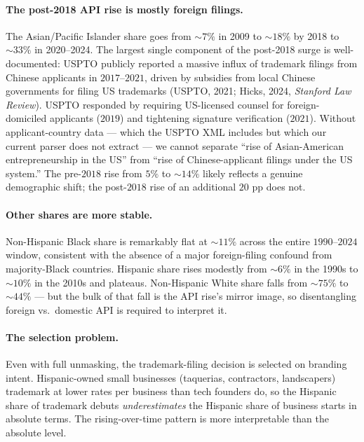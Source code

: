 \documentclass[11pt]{article}
\begin{document}
\paragraph{The post-2018 API rise is mostly foreign filings.} The
Asian/Pacific Islander share goes from $\sim 7\%$ in 2009 to $\sim 18\%$
by 2018 to $\sim 33\%$ in 2020--2024. The largest single component of
the post-2018 surge is well-documented: USPTO publicly reported a
massive influx of trademark filings from Chinese applicants in
$2017$--$2021$, driven by subsidies from local Chinese governments
for filing US trademarks (USPTO, 2021; Hicks, 2024, \emph{Stanford
Law Review}). USPTO responded by requiring US-licensed counsel for
foreign-domiciled applicants ($2019$) and tightening signature
verification ($2021$). Without applicant-country data --- which the
USPTO XML includes but which our current parser does not extract ---
we cannot separate ``rise of Asian-American entrepreneurship in the
US'' from ``rise of Chinese-applicant filings under the US system.''
The pre-$2018$ rise from $5\%$ to $\sim 14\%$ likely reflects a
genuine demographic shift; the post-$2018$ rise of an additional
$20$ pp does not.

\paragraph{Other shares are more stable.} Non-Hispanic Black share
is remarkably flat at $\sim 11\%$ across the entire $1990$--$2024$
window, consistent with the absence of a major foreign-filing
confound from majority-Black countries. Hispanic share rises modestly
from $\sim 6\%$ in the 1990s to $\sim 10\%$ in the 2010s and plateaus.
Non-Hispanic White share falls from $\sim 75\%$ to $\sim 44\%$ --- but
the bulk of that fall is the API rise's mirror image, so
disentangling foreign vs.\ domestic API is required to interpret it.

\paragraph{The selection problem.} Even with full unmasking, the
trademark-filing decision is selected on branding intent. Hispanic-owned
small businesses (taquerias, contractors, landscapers) trademark at
lower rates per business than tech founders do, so the Hispanic
share of trademark debuts \emph{underestimates} the Hispanic share
of business starts in absolute terms. The rising-over-time pattern is
more interpretable than the absolute level.
\end{document}
